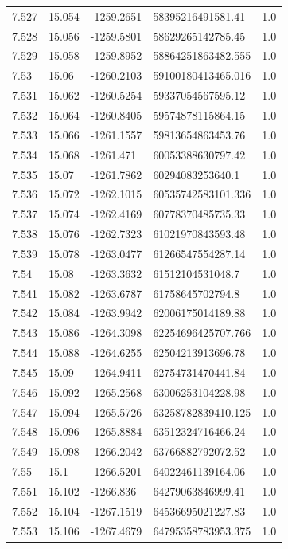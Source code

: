 \begin{tabular}{lllll}
7.527 & 15.054 & -1259.2651 & 58395216491581.41 & 1.0 \\
7.528 & 15.056 & -1259.5801 & 58629265142785.45 & 1.0 \\
7.529 & 15.058 & -1259.8952 & 58864251863482.555 & 1.0 \\
7.53 & 15.06 & -1260.2103 & 59100180413465.016 & 1.0 \\
7.531 & 15.062 & -1260.5254 & 59337054567595.12 & 1.0 \\
7.532 & 15.064 & -1260.8405 & 59574878115864.15 & 1.0 \\
7.533 & 15.066 & -1261.1557 & 59813654863453.76 & 1.0 \\
7.534 & 15.068 & -1261.471 & 60053388630797.42 & 1.0 \\
7.535 & 15.07 & -1261.7862 & 60294083253640.1 & 1.0 \\
7.536 & 15.072 & -1262.1015 & 60535742583101.336 & 1.0 \\
7.537 & 15.074 & -1262.4169 & 60778370485735.33 & 1.0 \\
7.538 & 15.076 & -1262.7323 & 61021970843593.48 & 1.0 \\
7.539 & 15.078 & -1263.0477 & 61266547554287.14 & 1.0 \\
7.54 & 15.08 & -1263.3632 & 61512104531048.7 & 1.0 \\
7.541 & 15.082 & -1263.6787 & 61758645702794.8 & 1.0 \\
7.542 & 15.084 & -1263.9942 & 62006175014189.88 & 1.0 \\
7.543 & 15.086 & -1264.3098 & 62254696425707.766 & 1.0 \\
7.544 & 15.088 & -1264.6255 & 62504213913696.78 & 1.0 \\
7.545 & 15.09 & -1264.9411 & 62754731470441.84 & 1.0 \\
7.546 & 15.092 & -1265.2568 & 63006253104228.98 & 1.0 \\
7.547 & 15.094 & -1265.5726 & 63258782839410.125 & 1.0 \\
7.548 & 15.096 & -1265.8884 & 63512324716466.24 & 1.0 \\
7.549 & 15.098 & -1266.2042 & 63766882792072.52 & 1.0 \\
7.55 & 15.1 & -1266.5201 & 64022461139164.06 & 1.0 \\
7.551 & 15.102 & -1266.836 & 64279063846999.41 & 1.0 \\
7.552 & 15.104 & -1267.1519 & 64536695021227.83 & 1.0 \\
7.553 & 15.106 & -1267.4679 & 64795358783953.375 & 1.0 \\

\end{tabular}
